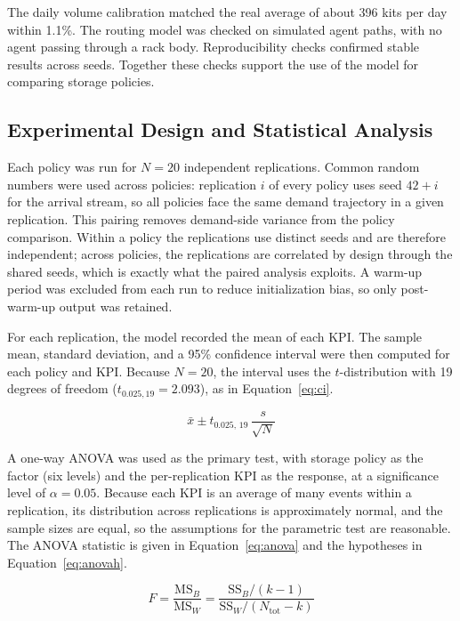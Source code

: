 \documentclass[conference]{IEEEtran}
\begin{document}
The daily volume calibration matched the real average of about 396 kits per
day within 1.1\%. The routing model was checked on simulated agent paths, with
no agent passing through a rack body. Reproducibility checks confirmed stable
results across seeds. Together these checks support the use of the model for
comparing storage policies.

\subsection{Experimental Design and Statistical Analysis}
\label{sec:expdesign}
Each policy was run for $N=20$ independent replications. Common random numbers
were used across policies: replication $i$ of every policy uses seed
$42+i$ for the arrival stream, so all policies face the same demand
trajectory in a given replication. This pairing removes demand-side variance
from the policy comparison. Within a policy the replications use distinct
seeds and are therefore independent; across policies, the replications are
correlated by design through the shared seeds, which is exactly what the
paired analysis exploits. A warm-up period was excluded from each run to
reduce initialization bias, so only post-warm-up output was retained.

For each replication, the model recorded the mean of each KPI. The sample
mean, standard deviation, and a 95\% confidence interval were then computed
for each policy and KPI. Because $N=20$, the interval uses the
$t$-distribution with 19 degrees of freedom ($t_{0.025,19}=2.093$), as in
Equation~\eqref{eq:ci}.

\begin{equation}
\label{eq:ci}
\bar{x} \pm t_{0.025,\,19}\,\frac{s}{\sqrt{N}}
\end{equation}

A one-way ANOVA was used as the primary test, with storage policy as the
factor (six levels) and the per-replication KPI as the response, at a
significance level of $\alpha=0.05$. Because each KPI is an average of many
events within a replication, its distribution across replications is
approximately normal, and the sample sizes are equal, so the assumptions for
the parametric test are reasonable. The ANOVA statistic is given in
Equation~\eqref{eq:anova} and the hypotheses in Equation~\eqref{eq:anovah}.

\begin{equation}
\label{eq:anova}
F = \frac{\mathrm{MS}_{B}}{\mathrm{MS}_{W}}
  = \frac{\mathrm{SS}_{B}/(k-1)}{\mathrm{SS}_{W}/(N_{\text{tot}}-k)}
\end{equation}
\end{document}
